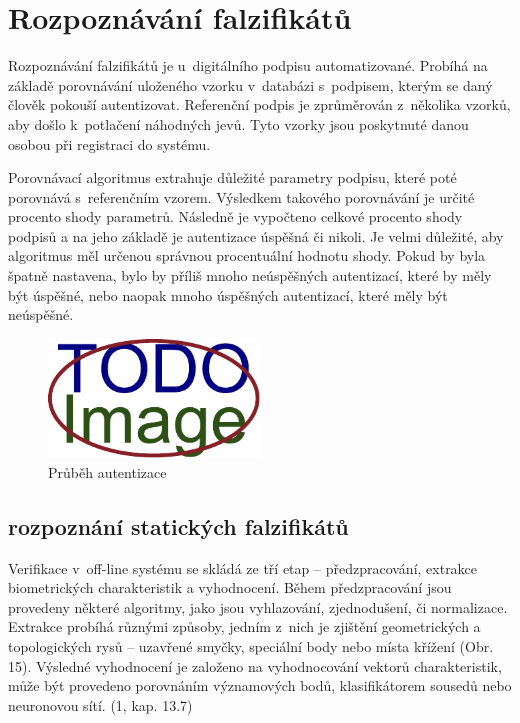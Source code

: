 \section{Rozpoznávání falzifikátů}
Rozpoznávání falzifikátů je u~digitálního podpisu automatizované.
Probíhá na základě porovnávání uloženého vzorku v~databázi s~podpisem, kterým se daný člověk pokouší autentizovat. %
Referenční podpis je zprůměrován z~několika vzorků, aby došlo k~potlačení náhodných jevů. %
Tyto vzorky jsou poskytnuté danou osobou při registraci do systému.

Porovnávací algoritmus extrahuje důležité parametry podpisu, které poté porovnává s~referenčním vzorem. 
Výsledkem takového porovnávání je určité procento shody parametrů.
Následně je vypočteno celkové procento shody podpisů a na jeho základě je autentizace úspěšná či nikoli.
Je velmi důležité, aby algoritmus měl určenou správnou procentuální hodnotu shody.
Pokud by byla špatně nastavena, bylo by příliš mnoho neúspěšných autentizací, které by měly být úspěšné, nebo naopak mnoho úspěšných autentizací, které měly být neúspěšné.

\begin{figure}[h]
\centering
\includegraphics[width=0.5\textwidth]{obrazky-figures/placeholder.pdf}
\caption{Průběh autentizace}
\label{fig:my-pdf}
\end{figure}

\subsection{rozpoznání statických falzifikátů} %
Verifikace v~off-line systému se skládá ze tří etap – předzpracování, extrakce biometrických
charakteristik a vyhodnocení. Během předzpracování jsou provedeny některé algoritmy, jako
jsou vyhlazování, zjednodušení, či normalizace. Extrakce probíhá různými způsoby, jedním
z~nich je zjištění geometrických a topologických rysů – uzavřené smyčky, speciální body
nebo místa křížení (Obr. 15). Výsledné vyhodnocení je založeno na vyhodnocování vektorů
charakteristik, může být provedeno porovnáním významových bodů, klasifikátorem sousedů
nebo neuronovou sítí. (1, kap. 13.7) %


